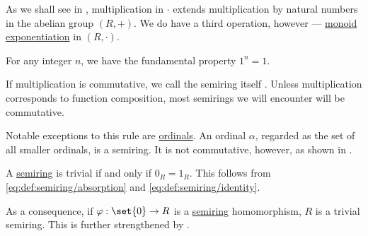 \begin{definition}
\begin{thmenum}
     As we shall see in , multiplication in \( \cdot \) extends multiplication by natural numbers in the abelian group \( (R, +) \). We do have a third operation, however --- \hyperref[def:monoid/exponentiation]{monoid exponentiation} in \( (R, \cdot) \).

    For any integer \( n \), we have the fundamental property \( 1^n = 1 \).

     If multiplication is commutative, we call the semiring itself . Unless multiplication corresponds to function composition, most semirings we will encounter will be commutative.

    Notable exceptions to this rule are \hyperref[def:ordinal]{ordinals}. An ordinal \( \alpha \), regarded as the set of all smaller ordinals, is a semiring. It is not commutative, however, as shown in .
  \end{thmenum}
\end{definition}

\begin{example}\label{ex:trivial_semiring}
  A \hyperref[def:semiring/homomorphism]{semiring} is trivial if and only if \( 0_R = 1_R \). This follows from \eqref{eq:def:semiring/absorption} and \eqref{eq:def:semiring/identity}.

  As a consequence, if \( \varphi: \set{ 0 } \to R \) is a \hyperref[def:semiring/homomorphism]{semiring} homomorphism, \( R \) is a trivial semiring. This is further strengthened by .
\end{example}

